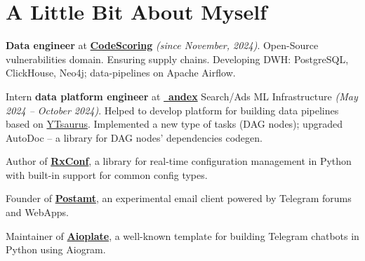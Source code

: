 \documentclass[a4paper,11pt]{article}
\newcommand{\MySkip}{
\vskip10pt
}
\begin{document}
\begin{adjustbox}{valign=t}
\begin{minipage}{0.65\textwidth}
\section*{A Little Bit About Myself}
\begin{flushleft}

\textbf{Data engineer} at \textbf{\href{https://codescoring.ru/}{CodeScoring}} \textit{(since November, 2024)}. Open-Source vulnerabilities domain.
Ensuring supply chains. Developing DWH: PostgreSQL, ClickHouse, Neo4j; data-pipelines on Apache Airflow.

\MySkip

Intern \textbf{data platform engineer} at \href{https://ya.ru}{~\hspace{-0.40em}\textbf{andex}} Search/Ads ML Infrastructure \textit{(May 2024 -- October 2024)}. Helped to develop platform for building data pipelines based on \href{https://github.com/ytsaurus/ytsaurus}{YTsaurus}. Implemented a new type of tasks (DAG nodes); upgraded AutoDoc -- a library for DAG nodes' dependencies codegen.

\MySkip

Author of \href{https://realkarych.github.io/rxconf/}{\textbf{RxConf}}, a library for real-time configuration management in Python with built-in support for common config types.

\MySkip

Founder of \hspace{0.3em}\href{https://github.com/realkarych/postamt/}{ \hspace{-0.1em}\textbf{Postamt}}, an experimental email client powered by Telegram forums and WebApps.

\MySkip

Maintainer of \hspace{0.2em}\href{https://github.com/realkarych/aioplate/}{\faGithub\hspace{0.1em}\textbf{Aioplate}}, a well-known template for building Telegram chatbots in Python using Aiogram.


\end{flushleft}
\end{minipage}
\end{adjustbox}
\end{document}
